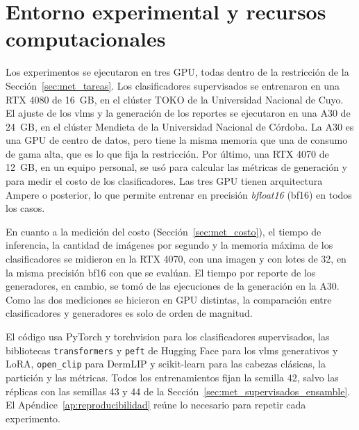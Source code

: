 \section{Entorno experimental y recursos computacionales}
\label{sec:met_entorno}

Los experimentos se ejecutaron en tres GPU, todas dentro de la restricción de la Sección~\ref{sec:met_tareas}. Los
clasificadores supervisados se entrenaron en una RTX 4080 de 16~GB, en el clúster TOKO de la Universidad Nacional de
Cuyo. El ajuste de los \glspl{vlm} y la generación de los reportes se ejecutaron en una A30 de 24~GB, en el clúster
Mendieta de la Universidad Nacional de Córdoba. La A30 es una GPU de centro de datos, pero tiene la misma memoria que
una de consumo de gama alta, que es lo que fija la restricción. Por último, una RTX 4070 de 12~GB, en un equipo personal, se usó para
calcular las métricas de generación y para medir el costo de los clasificadores. Las tres GPU tienen arquitectura Ampere
o posterior, lo que permite entrenar en precisión \emph{bfloat16} (bf16) en todos los casos.

En cuanto a la medición del costo (Sección~\ref{sec:met_costo}), el tiempo de inferencia, la cantidad de imágenes por
segundo y la memoria máxima de los clasificadores se midieron en la RTX 4070, con una imagen y con lotes de 32, en la
misma precisión bf16 con que se evalúan. El tiempo por reporte de los
generadores, en cambio, se tomó de las ejecuciones de la generación en la A30. Como las dos mediciones se hicieron en
GPU distintas, la comparación entre clasificadores y generadores es solo de orden de magnitud.

El código usa PyTorch y torchvision para los clasificadores supervisados, las bibliotecas \texttt{transformers} y
\texttt{peft} de Hugging Face para los \glspl{vlm} generativos y LoRA, \texttt{open\_clip} para DermLIP y scikit-learn
para las cabezas clásicas, la partición y las métricas. Todos los entrenamientos fijan la semilla 42, salvo las
réplicas con las semillas 43 y 44 de la Sección~\ref{sec:met_supervisados_ensamble}. El
Apéndice~\ref{ap:reproducibilidad} reúne lo necesario para repetir cada experimento.

